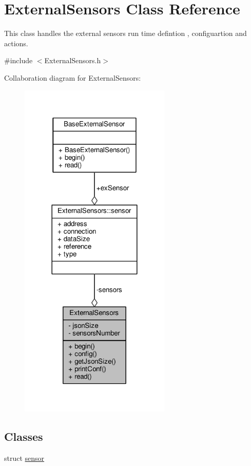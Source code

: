 \hypertarget{classExternalSensors}{}\section{External\+Sensors Class Reference}
\label{classExternalSensors}


This class handles the external sensors run time defintion , configuartion and actions.  




{\ttfamily \#include $<$External\+Sensors.\+h$>$}



Collaboration diagram for External\+Sensors\+:
\nopagebreak
\begin{figure}[H]
\begin{center}
\leavevmode
\includegraphics[width=204pt]{classExternalSensors__coll__graph}
\end{center}
\end{figure}
\subsection*{Classes}
\begin{DoxyCompactItemize}
\item 
struct \hyperlink{structExternalSensors_1_1sensor}{sensor}
\end{DoxyCompactItemize}
